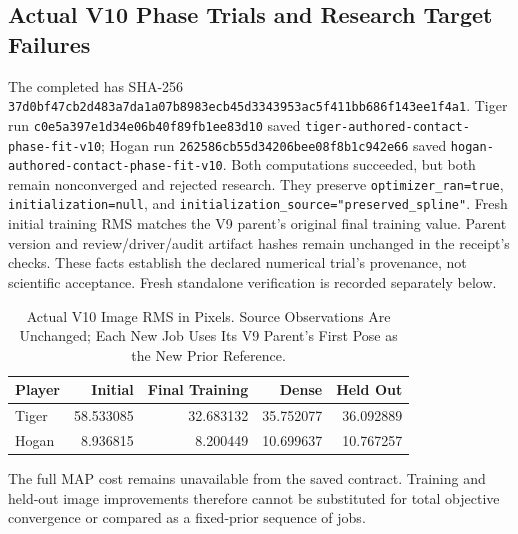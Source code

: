 \documentclass[11pt,letterpaper]{article}
\newcommand{\code}[1]{\nolinkurl{#1}}
\newcommand{\hash}[1]{{\footnotesize\nolinkurl{#1}}}
\begin{document}
\subsection{Actual V10 Phase Trials and Research Target Failures}
The completed  has SHA-256
\hash{37d0bf47cb2d483a7da1a07b8983ecb45d3343953ac5f411bb686f143ee1f4a1}.
Tiger run \code{c0e5a397e1d34e06b40f89fb1ee83d10} saved
\code{tiger-authored-contact-phase-fit-v10}; Hogan run
\code{262586cb55d34206bee08f8b1c942e66} saved
\code{hogan-authored-contact-phase-fit-v10}. Both computations succeeded,
but both remain nonconverged and rejected research. They preserve
\code{optimizer_ran=true}, \code{initialization=null}, and
\code{initialization_source="preserved_spline"}. Fresh initial training RMS
matches the V9 parent's original final training value. Parent version and
review/driver/audit artifact hashes remain unchanged in the receipt's checks.
These facts establish the declared numerical trial's provenance, not
scientific acceptance. Fresh standalone verification is recorded separately
below.

\begin{table}[ht]\centering\small
\begin{tabular}{@{}lrrrr@{}}
\toprule Player & Initial & Final Training & Dense & Held Out\\\midrule
Tiger & 58.533085 & 32.683132 & 35.752077 & 36.092889\\
Hogan & 8.936815 & 8.200449 & 10.699637 & 10.767257\\
\bottomrule
\end{tabular}
\caption{Actual V10 Image RMS in Pixels. Source Observations Are Unchanged;
Each New Job Uses Its V9 Parent's First Pose as the New Prior Reference.}
\end{table}
The full MAP cost remains unavailable from the saved contract. Training and
held-out image improvements therefore cannot be substituted for total
objective convergence or compared as a fixed-prior sequence of jobs.
\end{document}
